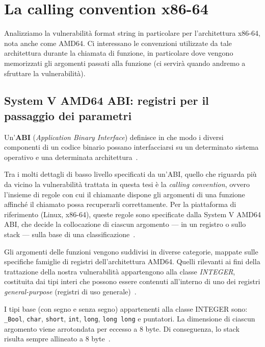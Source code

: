 \section{La calling convention x86-64}\label{sec:callconv}
Analizziamo la vulnerabilità format string in particolare per l'architettura x86-64, nota anche come AMD64. Ci interessano le convenzioni utilizzate da tale architettura durante la chiamata di funzione, in particolare dove vengono memorizzati gli argomenti passati alla funzione (ci servirà quando andremo a sfruttare la vulnerabilità).

\subsection{System V AMD64 ABI: registri per il passaggio dei parametri}\label{subsec:sysv_registri}
\begin{defn}[ABI]\label{def:abi}
Un'\textbf{ABI} (\emph{Application Binary Interface}) definisce in che modo i diversi componenti di un codice binario possano interfacciarsi su un determinato sistema operativo e una determinata architettura~\cite{silberschatz2019}.
\end{defn}

Tra i molti dettagli di basso livello specificati da un'ABI, quello che riguarda più da vicino la vulnerabilità trattata in questa tesi è la \emph{calling convention}, ovvero l'insieme di regole con cui il chiamante dispone gli argomenti di una funzione affinché il chiamato possa recuperarli correttamente. Per la piattaforma di riferimento (Linux, x86-64), queste regole sono specificate dalla System V AMD64 ABI, che decide la collocazione di ciascun argomento --- in un registro o sullo stack --- sulla base di una classificazione~\cite{psabi2025}.

Gli argomenti delle funzioni vengono suddivisi in diverse categorie, mappate sulle specifiche famiglie di registri dell'architettura AMD64. Quelli rilevanti ai fini della trattazione della nostra vulnerabilità appartengono alla classe \emph{INTEGER}, costituita dai tipi interi che possono essere contenuti all'interno di uno dei registri \emph{general-purpose} (registri di uso generale)~\cite{psabi2025}.

I tipi base (con segno e senza segno) appartenenti alla classe INTEGER sono: \texttt{\_Bool}, \texttt{char}, \texttt{short}, \texttt{int}, \texttt{long}, \texttt{long long} e puntatori.
La dimensione di ciascun argomento viene arrotondata per eccesso a 8 byte. Di conseguenza, lo stack risulta sempre allineato a 8 byte~\cite{psabi2025}.

